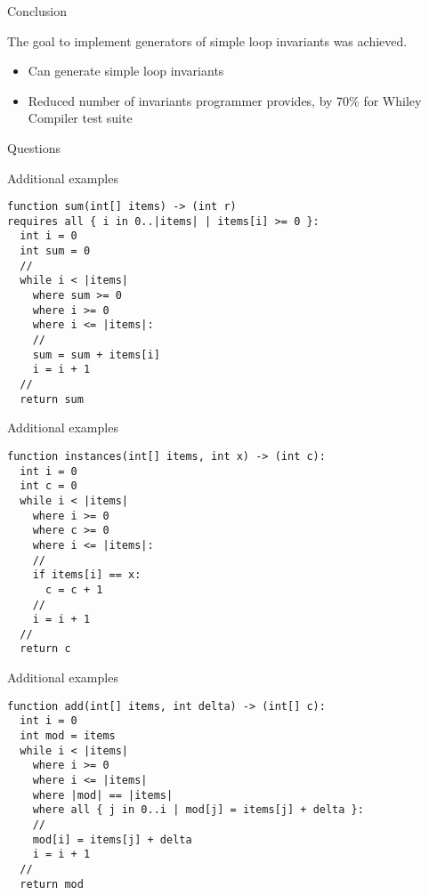 \begin{frame}{Conclusion}

The goal to implement generators of simple loop invariants was achieved.

\begin{itemize}
\item Can generate simple loop invariants
\item Reduced number of invariants programmer provides, by 70\% for
    Whiley Compiler test suite
\end{itemize}

\end{frame}


\begin{frame}

\begin{center}
    \Huge{Questions}
\end{center}

\end{frame}

\begin{frame}[fragile]{Additional examples}

\begin{verbatim}
function sum(int[] items) -> (int r)
requires all { i in 0..|items| | items[i] >= 0 }:
  int i = 0
  int sum = 0
  //
  while i < |items|
    where sum >= 0
    where i >= 0
    where i <= |items|:
    //
    sum = sum + items[i]
    i = i + 1
  //
  return sum
\end{verbatim}

\end{frame}

\begin{frame}[fragile]{Additional examples}

\begin{verbatim}
function instances(int[] items, int x) -> (int c):
  int i = 0
  int c = 0
  while i < |items|
    where i >= 0
    where c >= 0
    where i <= |items|:
    //
    if items[i] == x:
      c = c + 1
    //
    i = i + 1
  //
  return c
\end{verbatim}

\end{frame}

\begin{frame}[fragile]{Additional examples}

\begin{verbatim}
function add(int[] items, int delta) -> (int[] c):
  int i = 0
  int mod = items
  while i < |items|
    where i >= 0
    where i <= |items|
    where |mod| == |items|
    where all { j in 0..i | mod[j] = items[j] + delta }:
    //
    mod[i] = items[j] + delta
    i = i + 1
  //
  return mod
\end{verbatim}

\end{frame}

